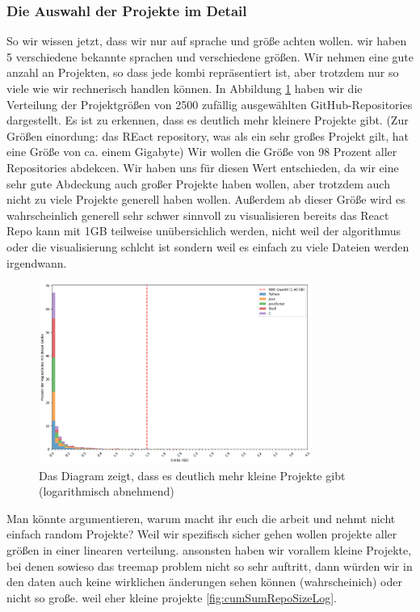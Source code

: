 \subsubsection{Die Auswahl der Projekte im Detail} \label{sec:auswahlDerProjekteImDetail}
So wir wissen jetzt, dass wir nur auf sprache und größe achten wollen. wir haben 5 verschiedene bekannte sprachen und verschiedene größen. Wir nehmen eine gute anzahl an Projekten, so dass jede kombi repräsentiert ist, aber trotzdem nur so viele wie wir rechnerisch handlen können. 
In Abbildung \ref{fig:repoGroesseVerteilungUnfiltered} haben wir die Verteilung der Projektgrößen von 2500 zufällig ausgewählten GitHub-Repositories dargestellt. Es ist zu erkennen, dass es deutlich mehr kleinere Projekte gibt. (Zur Größen einordung: das REact repository, was als ein sehr großes Projekt gilt, hat eine Größe von ca.  einem Gigabyte)
Wir wollen die Größe von 98 Prozent aller Repositories abdekcen. Wir haben uns für diesen Wert entschieden, da wir eine sehr gute Abdeckung auch großer Projekte haben wollen, aber trotzdem auch nicht zu viele Projekte generell haben wollen. Außerdem ab dieser Größe wird es wahrscheinlich generell sehr schwer sinnvoll zu visualisieren bereits das React Repo kann mit 1GB teilweise unübersichlich werden, nicht weil der algorithmus oder die visualisierung schlcht ist sondern weil es einfach zu viele Dateien werden irgendwann. %

\begin{figure}
    \centering
    \includegraphics[width=0.8\textwidth]{images/datenanalyse/repoSizeUnfilteredVerteilung.png}
    \caption{Das Diagram zeigt, dass es deutlich mehr kleine Projekte gibt (logarithmisch abnehmend)}
    \label{fig:repoGroesseVerteilungUnfiltered}
\end{figure}

Man könnte argumentieren, warum macht ihr euch die arbeit und nehmt nicht einfach random Projekte? Weil wir spezifisch sicher gehen wollen projekte aller größen in einer linearen verteilung. ansonsten haben wir vorallem kleine Projekte, bei denen sowieso das treemap problem nicht so sehr auftritt, dann würden wir in den daten auch keine wirklichen änderungen sehen können (wahrscheinich) oder nicht so große. weil eher kleine projekte \ref{fig:cumSumRepoSizeLog}.

